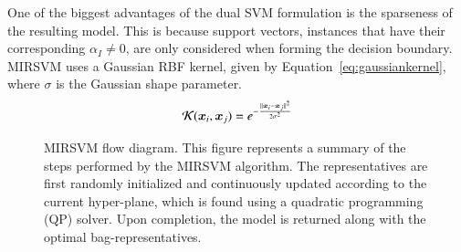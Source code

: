 \documentclass[preprint,12pt]{elsarticle}
\newcommand{\norm}[1]{{||#1||}}
\begin{document}
One of the biggest advantages of the dual SVM formulation is the sparseness of the resulting model. This is because support vectors, instances that have their corresponding $\alpha_I \neq 0$, are only considered when forming the decision boundary. MIRSVM uses a Gaussian RBF kernel, given by Equation~\eqref{eq:gaussiankernel}, where $\sigma$ is the Gaussian shape parameter.
\begin{equation}
\label{eq:gaussiankernel}
\centering
\mathcal{K}(\bm x_i, \bm x_j) = e^{-\frac{\norm{\bm x_i - \bm x_j}^2}{2\sigma^2}}
\end{equation}
\begin{figure}[tpb!]
\centering
\small
\label{fig:mirsvm}
\begin{minipage}{\textwidth}
\caption{MIRSVM flow diagram. This figure represents a summary of the steps performed by the MIRSVM algorithm. The representatives are first randomly initialized and continuously updated according to the current hyper-plane, which is found using a quadratic programming (QP) solver. Upon completion, the model is returned along with the optimal bag-representatives.}
\end{minipage}


\end{figure}
\end{document}

